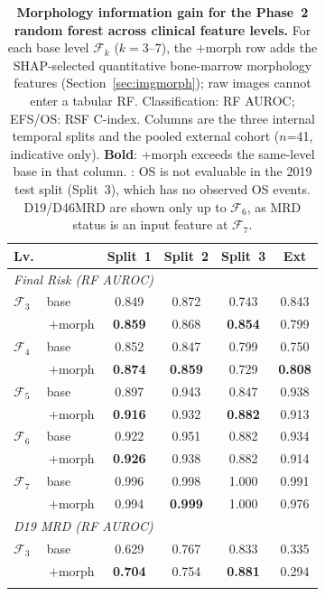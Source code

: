 \documentclass[pdflatex,sn-nature]{sn-jnl}
\begin{document}
\begin{table}[p]
\caption{\textbf{Morphology information gain for the Phase~2 random forest
across clinical feature levels.} For each base level $\mathcal{F}_k$
($k=3\text{--}7$), the $+$morph row adds the SHAP-selected quantitative
bone-marrow morphology features (Section~\ref{sec:imgmorph}); raw images
cannot enter a tabular RF. Classification: RF AUROC; EFS/OS: RSF C-index.
Columns are the three internal temporal splits and the pooled external
cohort ($n$=41, indicative only). \textbf{Bold}: $+$morph exceeds the
same-level base in that column. \textemdash: OS is not evaluable in the
2019 test split (Split~3), which has no observed OS events. D19/D46MRD
are shown only up to $\mathcal{F}_6$, as MRD status is an input feature
at $\mathcal{F}_7$.}
\label{tab:phase2_morph}
\centering
\footnotesize
\setlength{\tabcolsep}{5pt}
\begin{tabular}{@{}ll cccc@{}}
\toprule
\textbf{Lv.} & & \textbf{Split~1} & \textbf{Split~2} & \textbf{Split~3} & \textbf{Ext} \\
\midrule
\multicolumn{6}{l}{\textit{Final Risk (RF AUROC)}} \\
$\mathcal{F}_3$ & base & 0.849 & 0.872 & 0.743 & 0.843 \\
& \;\,$+$morph & \textbf{0.859} & 0.868 & \textbf{0.854} & 0.799 \\
\addlinespace[2pt]
$\mathcal{F}_4$ & base & 0.852 & 0.847 & 0.799 & 0.750 \\
& \;\,$+$morph & \textbf{0.874} & \textbf{0.859} & 0.729 & \textbf{0.808} \\
\addlinespace[2pt]
$\mathcal{F}_5$ & base & 0.897 & 0.943 & 0.847 & 0.938 \\
& \;\,$+$morph & \textbf{0.916} & 0.932 & \textbf{0.882} & 0.913 \\
\addlinespace[2pt]
$\mathcal{F}_6$ & base & 0.922 & 0.951 & 0.882 & 0.934 \\
& \;\,$+$morph & \textbf{0.926} & 0.938 & 0.882 & 0.914 \\
\addlinespace[2pt]
$\mathcal{F}_7$ & base & 0.996 & 0.998 & 1.000 & 0.991 \\
& \;\,$+$morph & 0.994 & \textbf{0.999} & 1.000 & 0.976 \\
\midrule
\multicolumn{6}{l}{\textit{D19 MRD (RF AUROC)}} \\
$\mathcal{F}_3$ & base & 0.629 & 0.767 & 0.833 & 0.335 \\
& \;\,$+$morph & \textbf{0.704} & 0.754 & \textbf{0.881} & 0.294 \\
\addlinespace[2pt]

\end{tabular}
\end{table}
\end{document}
